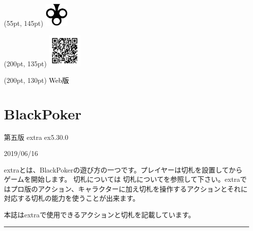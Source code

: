 \documentclass[twocolumn,a5paper,papersize,10pt]{jarticle}
\title{\empty}
\author{\empty}
\date{\empty}
\begin{document}
\begin{textblock*}{0.4\linewidth}(55pt, 145pt)
    \centering
    \includegraphics[width=1.2cm]{blackpoker_logo.pdf}
\end{textblock*}

\begin{textblock*}{0.4\linewidth}(200pt, 135pt)
    \centering
    \includegraphics[width=1.7cm,keepaspectratio]{qr_blackpoker-support_v5-ex.pdf}
\end{textblock*}
\begin{textblock*}{0.4\linewidth}(200pt, 130pt)
    \centering
    \textcolor{black}{Web版}
\end{textblock*}

\section*{\textrm{\Large BlackPoker}}
\vspace{-1zh}%
\noindent

\begin{center}
第五版 extra
ex5.30.0

{\scriptsize 2019/06/16}

\end{center}

\scriptsize%
\renewcommand{\labelitemi}{・}%

{\quad}extraとは、BlackPokerの遊び方の一つです。プレイヤーは切札を設置してからゲームを開始します。
切札については 切札についてを参照して下さい。extraではプロ版のアクション、キャラクターに加え切札を操作するアクションとそれに対応する切札の能力を使うことが出来ます。

{\quad}本誌はextraで使用できるアクションと切札を記載しています。

\vspace{2mm}%
\hrule height 0.5mm depth 0mm width 66.5mm %
\vspace{-3zh}%
\end{document}
